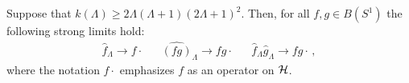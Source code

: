 \begin{theorem}\label{theoremConvergesFuzzyCircleD2}
Suppose that $k(\Lambda) \geq 2\Lambda(\Lambda+1)(2\Lambda+1)^2$. Then, for all $f, g \in B(S^1)$ the following strong limits hold:
\begin{align}
    \hat f_\Lambda \to f\cdot && \hat{(fg)}_\Lambda \to fg\cdot && \hat f_\Lambda \hat g_\Lambda \to fg \cdot\,,
\end{align}
where the notation $f\cdot$ emphasizes $f$ as an operator on $\mathcal H$.
\end{theorem}



    
    
